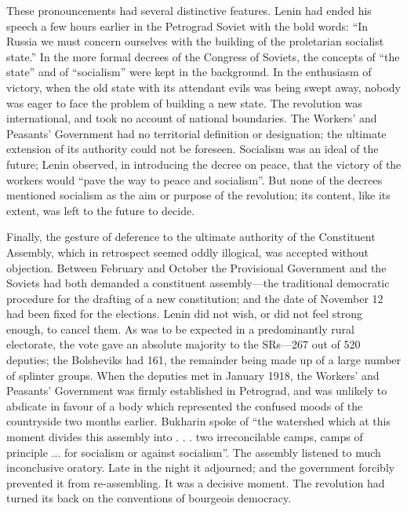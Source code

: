 These pronouncements had several distinctive features. Lenin had ended his speech a few hours earlier in the Petrograd Soviet with the bold words: ``In Russia we must concern ourselves with the building of the proletarian socialist state.'' In the more formal decrees of the Congress of Soviets, the concepts of ``the state'' and of ``socialism'' were kept in the background. In the enthusiasm of victory, when the old state with its attendant evils was being swept away, nobody was eager to face the problem of building a new state. The revolution was international, and took no account of national boundaries. The Workers' and Peasants' Government had no territorial definition or designation; the ultimate extension of its authority could not be foreseen. Socialism was an ideal of the future; Lenin observed, in introducing the decree on peace, that the victory of the workers would ``pave the way to peace and socialism''. But none of the decrees mentioned socialism as the aim or purpose of the revolution; its content, like its extent, was left to the future to decide. 

Finally, the gesture of deference to the ultimate authority of the Constituent Assembly, which in retrospect seemed oddly illogical, was accepted without objection. Between February and October the Provisional Government and the Soviets had both demanded a constituent assembly---the traditional democratic procedure for the drafting of a new constitution; and the date of November 12 had been fixed for the elections. Lenin did not wish, or did not feel strong enough, to cancel them. As was to be expected in a predominantly rural electorate, the vote gave an absolute majority to the SRs---267 out of 520 deputies; the Bolsheviks had 161, the remainder being made up of a large number of splinter groups. When the deputies met in January 1918, the Workers' and Peasants' Government was firmly established in Petrograd, and was unlikely to abdicate in favour of a body which represented the confused moods of the countryside two months earlier. Bukharin spoke of ``the watershed which at this moment divides this assembly into . . . two irreconcilable camps, camps of principle ... for socialism or against socialism''. The assembly listened to much inconclusive oratory. Late in the night it adjourned; and the government forcibly prevented it from re-assembling. It was a decisive moment. The revolution had turned its back on the conventions of bourgeois democracy. 

